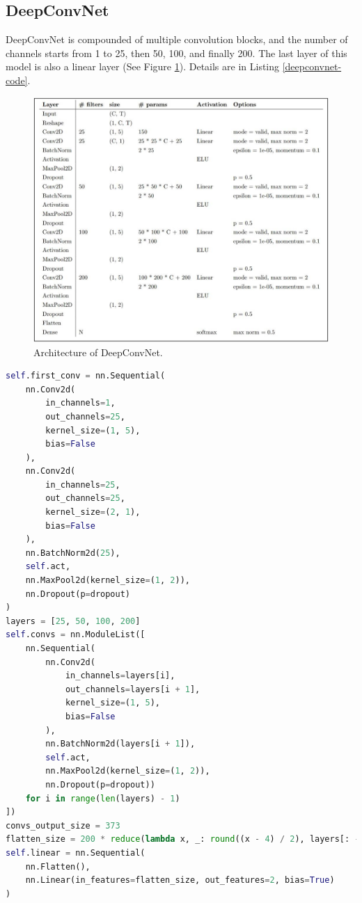 \subsection{DeepConvNet}
\indent
	DeepConvNet is compounded of multiple convolution blocks, and
	the number of channels starts from 1 to 25, then 50, 100, and finally 200.
	The last layer of this model is also a linear layer (See Figure \ref{deepconvnet}). 
	Details are in Listing \ref{deepconvnet-code}.

	\begin{figure}[H]
		\centering
		\includegraphics[scale=0.5]{img/deepconvnet.png}
		\caption{Architecture of DeepConvNet.}
		\label{deepconvnet}
	\end{figure}
\begin{lstlisting}[language=Python, caption={Python code of DeepConvNet.}, label={deepconvnet-code}]
self.first_conv = nn.Sequential(
	nn.Conv2d(
		in_channels=1,
		out_channels=25,
		kernel_size=(1, 5),
		bias=False
	),
	nn.Conv2d(
		in_channels=25,
		out_channels=25,
		kernel_size=(2, 1),
		bias=False
	),
	nn.BatchNorm2d(25),
	self.act,
	nn.MaxPool2d(kernel_size=(1, 2)),
	nn.Dropout(p=dropout)
)
layers = [25, 50, 100, 200]
self.convs = nn.ModuleList([
	nn.Sequential(
		nn.Conv2d(
			in_channels=layers[i],
			out_channels=layers[i + 1],
			kernel_size=(1, 5),
			bias=False
		),
		nn.BatchNorm2d(layers[i + 1]),
		self.act,
		nn.MaxPool2d(kernel_size=(1, 2)),
		nn.Dropout(p=dropout))
	for i in range(len(layers) - 1)
])
convs_output_size = 373
flatten_size = 200 * reduce(lambda x, _: round((x - 4) / 2), layers[: -1], convs_output_size) # 8600.
self.linear = nn.Sequential(
	nn.Flatten(),
	nn.Linear(in_features=flatten_size, out_features=2, bias=True)
)
\end{lstlisting}

